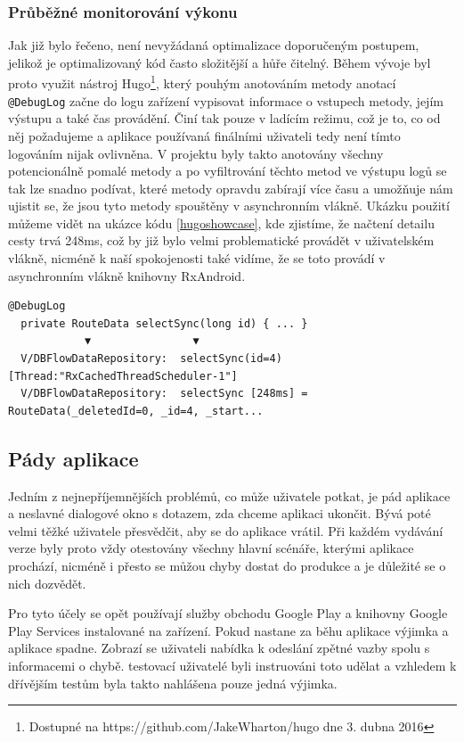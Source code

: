 \documentclass[czech,master,public,dept460,male,java,cpdeclaration]{diploma}
\begin{document}
\subsubsection{Průběžné monitorování výkonu}
Jak již bylo řečeno, není nevyžádaná optimalizace doporučeným postupem, jelikož je optimalizovaný kód
často složitější a hůře čitelný. Během vývoje byl proto využit nástroj
Hugo\footnote{Dostupné na https://github.com/JakeWharton/hugo dne 3. dubna 2016}, který pouhým
anotováním metody anotací \texttt{@DebugLog} začne do logu zařízení vypisovat informace o vstupech metody,
jejím výstupu a také čas provádění. Činí tak pouze v ladícím režimu, což je to, co od něj požadujeme
a aplikace používaná finálními uživateli tedy není tímto logováním nijak ovlivněna. V projektu byly
takto anotovány všechny potencionálně pomalé metody a po vyfiltrování těchto metod ve výstupu logů se
tak lze snadno podívat, které metody opravdu zabírají více času a umožňuje nám ujistit se, že jsou
tyto metody spouštěny v asynchronním vlákně. Ukázku použití můžeme vidět na ukázce kódu \ref{hugoshowcase},
kde zjistíme, že načtení detailu cesty trvá 248ms, což by již bylo velmi problematické provádět v uživatelském
vlákně, nicméně k naší spokojenosti také vidíme, že se toto provádí v asynchronním vlákně knihovny RxAndroid.

\begin{lstlisting}[label=hugoshowcase,caption=Využití nástroje Hugo pro výpisy informací o prováděných metodách]
  @DebugLog
  private RouteData selectSync(long id) { ... }
            ▼                ▼
  V/DBFlowDataRepository:  selectSync(id=4) [Thread:"RxCachedThreadScheduler-1"]
  V/DBFlowDataRepository:  selectSync [248ms] = RouteData(_deletedId=0, _id=4, _start...
\end{lstlisting}

\subsection{Pády aplikace}
Jedním z nejnepříjemnějších problémů, co může uživatele potkat, je pád aplikace a neslavné dialogové
okno s dotazem, zda chceme aplikaci ukončit. Bývá poté velmi těžké uživatele přesvědčit, aby se
do aplikace vrátil. Při každém vydávání verze byly proto vždy otestovány všechny hlavní scénáře,
kterými aplikace prochází, nicméně i přesto se můžou chyby dostat do produkce a je důležité se
 o nich dozvědět.

 Pro tyto účely se opět používají služby obchodu Google Play a knihovny Google Play Services instalované
 na zařízení. Pokud nastane za běhu aplikace výjimka a aplikace spadne. Zobrazí se uživateli nabídka
 k odeslání zpětné vazby spolu s informacemi o chybě. testovací uživatelé byli instruováni toto udělat
 a vzhledem k dřívějším testům byla takto nahlášena pouze jedná výjimka.
\end{document}
